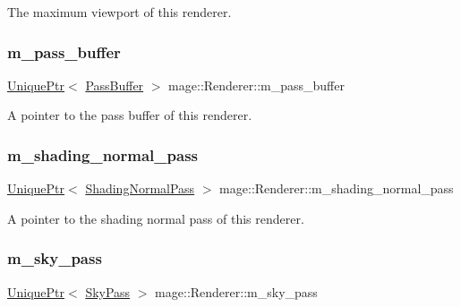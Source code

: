 The maximum viewport of this renderer. \hypertarget{classmage_1_1_renderer_a304d7bdeb64906cb51f87443cf7201e1}{}\label{classmage_1_1_renderer_a304d7bdeb64906cb51f87443cf7201e1} 
\subsubsection{\texorpdfstring{m\+\_\+pass\+\_\+buffer}{m\_pass\_buffer}}
{\footnotesize\ttfamily \hyperlink{namespacemage_a3316d7143a973e37adf1110f2e80ca31}{Unique\+Ptr}$<$ \hyperlink{structmage_1_1_pass_buffer}{Pass\+Buffer} $>$ mage\+::\+Renderer\+::m\+\_\+pass\+\_\+buffer\hspace{0.3cm}{\ttfamily [private]}}

A pointer to the pass buffer of this renderer. \hypertarget{classmage_1_1_renderer_a1867f2dd151f3180b8efebba5b018fc8}{}\label{classmage_1_1_renderer_a1867f2dd151f3180b8efebba5b018fc8} 
\subsubsection{\texorpdfstring{m\+\_\+shading\+\_\+normal\+\_\+pass}{m\_shading\_normal\_pass}}
{\footnotesize\ttfamily \hyperlink{namespacemage_a3316d7143a973e37adf1110f2e80ca31}{Unique\+Ptr}$<$ \hyperlink{classmage_1_1_shading_normal_pass}{Shading\+Normal\+Pass} $>$ mage\+::\+Renderer\+::m\+\_\+shading\+\_\+normal\+\_\+pass\hspace{0.3cm}{\ttfamily [private]}}

A pointer to the shading normal pass of this renderer. \hypertarget{classmage_1_1_renderer_a7e9d76a3294d0a5b2d99a5335ff0cd04}{}\label{classmage_1_1_renderer_a7e9d76a3294d0a5b2d99a5335ff0cd04} 
\subsubsection{\texorpdfstring{m\+\_\+sky\+\_\+pass}{m\_sky\_pass}}
{\footnotesize\ttfamily \hyperlink{namespacemage_a3316d7143a973e37adf1110f2e80ca31}{Unique\+Ptr}$<$ \hyperlink{classmage_1_1_sky_pass}{Sky\+Pass} $>$ mage\+::\+Renderer\+::m\+\_\+sky\+\_\+pass\hspace{0.3cm}{\ttfamily [private]}}

